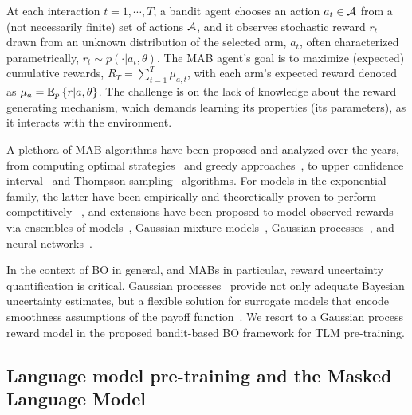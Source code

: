 At each interaction $t=1,\cdots, T$,
a bandit agent chooses an action $a_t \in \mathcal{A}$ from a (not necessarily finite) set of actions $\mathcal{A}$,
and it observes stochastic reward $r_t$ drawn from an unknown distribution of the selected arm, $a_t$,
often characterized parametrically, $r_t\sim p(\cdot|a_t, \theta)$.
%
The MAB agent's goal is to maximize (expected) cumulative rewards, $R_T=\sum_{t=1}^T \mu_{a,t}$,
with each arm's expected reward denoted as $\mu_a = \mathbb{E}_{p}\left\{ r|a,\theta \right\}$.
The challenge is on the lack of knowledge about the reward generating mechanism,
which demands learning its properties (\eg its parameters), as it interacts with the environment.

A plethora of MAB algorithms have been proposed and analyzed over the years,
from computing optimal strategies~\citep{j-Gittins1979} and greedy approaches~\citep{j-Auer2002},
to upper confidence interval~\citep{j-Lai1987,ip-Kaufmann2012} 
and Thompson sampling~\citep{j-Thompson1935} algorithms.
%
For models in the exponential family,
the latter have been empirically and theoretically proven to perform competitively ~\citep{j-Lai1987,ip-Kaufmann2012,ip-Agrawal2012,ip-Agrawal2013,ic-Korda2013}, 
and extensions have been proposed
to model observed rewards 
via ensembles of models~\citep{ip-Lu2017},
Gaussian mixture models~\citep{ip-Urteaga2018, j-Urteaga2018},
Gaussian processes~\citep{ip-Srinivas2010,ip-Gruenewaelder2010},
and neural networks~\citep{ic-Osband2016}.

In the context of BO in general, and MABs in particular, reward uncertainty quantification is critical.
Gaussian processes~\citep{b-Rasmussen2005} provide not only adequate Bayesian uncertainty estimates,
but a flexible solution for surrogate models that encode smoothness assumptions of the payoff function~\citep{ip-Krause2011, ip-Bogunovic2016, ip-Nguyen2020}.
We resort to a Gaussian process reward model in the proposed bandit-based BO framework for TLM pre-training.

\subsection{Language model pre-training and the Masked Language Model}
\label{ssec:roberta_pretraining}


